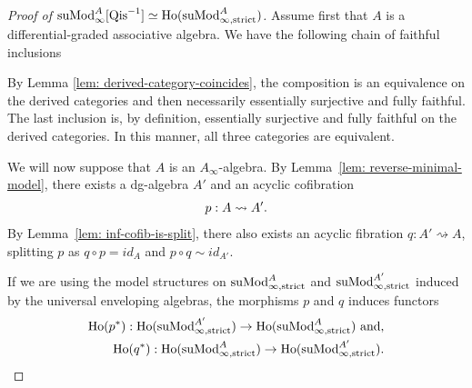 \documentclass[../thesis.tex]{subfiles}
\begin{document}
            \begin{proof}[Proof of $\tt{suMod}_\infty^A{[\tt{Qis}^{-1}]} \simeq \tt{Ho}(\tt{suMod}_{\infty, \tt{strict}}^A)$]
               Assume first that $A$ is a differential-graded associative algebra. We have the following chain of faithful inclusions
                \begin{center}
                \end{center}
                 By Lemma \ref{lem: derived-category-coincides}, the composition is an equivalence on the derived categories and then necessarily essentially surjective and fully faithful. The last inclusion is, by definition, essentially surjective and fully faithful on the derived categories. In this manner, all three categories are equivalent.

                 We will now suppose that $A$ is an $A_\infty$-algebra. By Lemma~\ref{lem: reverse-minimal-model}, there exists a dg-algebra $A'$ and an acyclic cofibration
                 \begin{align*}
                    p: A \rightsquigarrow A'\tt{.}
                 \end{align*}
                 By Lemma~\ref{lem: inf-cofib-is-split}, there also exists an acyclic fibration $q : A' \rightsquigarrow A$, splitting $p$ as $q \circ p = id_A$ and $p \circ q \sim id_{A'}$. 

                 If we are using the model structures on $\tt{suMod}_{\infty,\tt{strict}}^A$ and $\tt{suMod}_{\infty,\tt{strict}}^{A'}$ induced by the universal enveloping algebras, the morphisms $p$ and $q$ induces functors
                 \begin{align*}
                    \tt{Ho}(p^*) : \tt{Ho}(\tt{suMod}_{\infty,\tt{strict}}^{A'}) \rightarrow \tt{Ho}(\tt{suMod}_{\infty,\tt{strict}}^A)\tt{ and,}\\
                    \tt{Ho}(q^*) : \tt{Ho}(\tt{suMod}_{\infty,\tt{strict}}^A) \rightarrow \tt{Ho}(\tt{suMod}_{\infty,\tt{strict}}^{A'})\tt{.}
                 \end{align*}


\end{proof}
\end{document}
